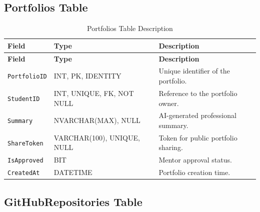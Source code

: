 \subsection{Portfolios Table}

\begin{longtable}{|>{\raggedright\arraybackslash}m{2.9cm}|>{\raggedright\arraybackslash}m{3.45cm}|>{\raggedright\arraybackslash}m{4.95cm}|}
\caption{Portfolios Table Description}
\label{tab:portfolios_table_description}
\\
\hline
\textbf{Field} & \textbf{Type} & \textbf{Description} \\
\hline
\endfirsthead
\hline
\textbf{Field} & \textbf{Type} & \textbf{Description} \\
\hline
\endhead
\texttt{PortfolioID} & INT, PK, IDENTITY & Unique identifier of the portfolio. \\
\hline
\texttt{StudentID} & INT, UNIQUE, FK, NOT NULL & Reference to the portfolio owner. \\
\hline
\texttt{Summary} & NVARCHAR(MAX), NULL & AI-generated professional summary. \\
\hline
\texttt{ShareToken} & VARCHAR(100), UNIQUE, NULL & Token for public portfolio sharing. \\
\hline
\texttt{IsApproved} & BIT & Mentor approval status. \\
\hline
\texttt{CreatedAt} & DATETIME & Portfolio creation time. \\
\hline
\end{longtable}

\subsection{GitHubRepositories Table}

